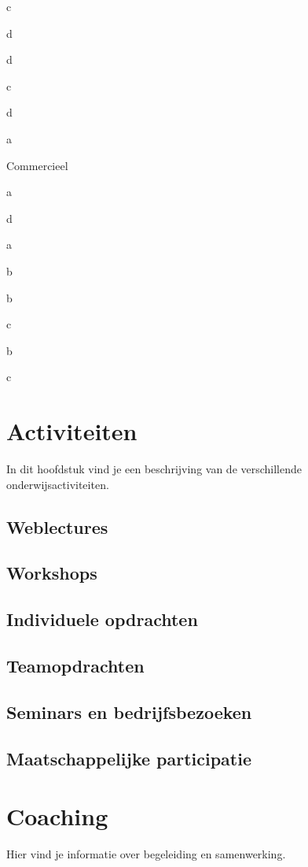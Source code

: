 \documentclass[]{book}
\begin{document}
c

d

d

c

d

a

Commercieel

a

d

a

b

b

c

b

c

\chapter{Activiteiten}\label{activiteiten}

In dit hoofdstuk vind je een beschrijving van de verschillende
onderwijsactiviteiten.

\section{Weblectures}\label{weblectures}

\section{Workshops}\label{workshops}

\section{Individuele opdrachten}\label{individuele-opdrachten}

\section{Teamopdrachten}\label{teamopdrachten}

\section{Seminars en
bedrijfsbezoeken}\label{seminars-en-bedrijfsbezoeken}

\section{Maatschappelijke
participatie}\label{maatschappelijke-participatie}

\chapter{Coaching}\label{coaching}

Hier vind je informatie over begeleiding en samenwerking.


\end{document}
